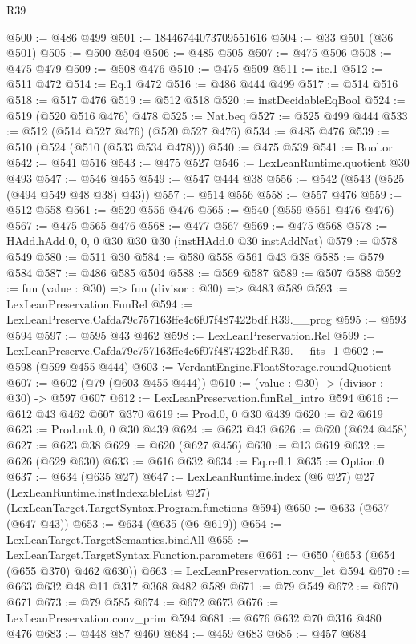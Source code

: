 \begin{lexlean}{R39}
\begin{coremodule}
@500 := @486 @499
@501 := 18446744073709551616
@504 := @33 @501 (@36 @501)
@505 := @500 @504
@506 := @485 @505
@507 := @475 @506
@508 := @475 @479
@509 := @508 @476
@510 := @475 @509
@511 := ite.{1}
@512 := @511 @472
@514 := Eq.{1} @472
@516 := @486 @444 @499
@517 := @514 @516
@518 := @517 @476
@519 := @512 @518
@520 := instDecidableEqBool
@524 := @519 (@520 @516 @476) @478
@525 := Nat.beq
@527 := @525 @499 @444
@533 := @512 (@514 @527 @476) (@520 @527 @476)
@534 := @485 @476
@539 := @510 (@524 (@510 (@533 @534 @478)))
@540 := @475 @539
@541 := Bool.or
@542 := @541 @516
@543 := @475 @527
@546 := LexLeanRuntime.quotient @30 @493
@547 := @546 @455
@549 := @547 @444 @38
@556 := @542 (@543 (@525 (@494 @549 @48 @38) @43))
@557 := @514 @556
@558 := @557 @476
@559 := @512 @558
@561 := @520 @556 @476
@565 := @540 (@559 @561 @476 @476)
@567 := @475 @565 @476
@568 := @477 @567
@569 := @475 @568
@578 := HAdd.hAdd.{0, 0, 0} @30 @30 @30 (instHAdd.{0} @30 instAddNat)
@579 := @578 @549
@580 := @511 @30
@584 := @580 @558 @561 @43 @38
@585 := @579 @584
@587 := @486 @585 @504
@588 := @569 @587
@589 := @507 @588
@592 := fun (value : @30) => fun (divisor : @30) => @483 @589
@593 := LexLeanPreservation.FunRel
@594 := LexLeanPreserve.Cafda79c757163ffe4c6f07f487422bdf.R39.__prog
@595 := @593 @594
@597 := @595 @43 @462
@598 := LexLeanPreservation.Rel
@599 := LexLeanPreserve.Cafda79c757163ffe4c6f07f487422bdf.R39.__fits_1
@602 := @598 (@599 @455 @444)
@603 := VerdantEngine.FloatStorage.roundQuotient
@607 := @602 (@79 (@603 @455 @444))
@610 := (value : @30) -> (divisor : @30) -> @597 @607
@612 := LexLeanPreservation.funRel_intro @594
@616 := @612 @43 @462 @607 @370
@619 := Prod.{0, 0} @30 @439
@620 := @2 @619
@623 := Prod.mk.{0, 0} @30 @439
@624 := @623 @43
@626 := @620 (@624 @458)
@627 := @623 @38
@629 := @620 (@627 @456)
@630 := @13 @619
@632 := @626 (@629 @630)
@633 := @616 @632
@634 := Eq.refl.{1}
@635 := Option.{0}
@637 := @634 (@635 @27)
@647 := LexLeanRuntime.index
    (@6 @27)
    @27
    (LexLeanRuntime.instIndexableList @27)
    (LexLeanTarget.TargetSyntax.Program.functions @594)
@650 := @633 (@637 (@647 @43))
@653 := @634 (@635 (@6 @619))
@654 := LexLeanTarget.TargetSemantics.bindAll
@655 := LexLeanTarget.TargetSyntax.Function.parameters
@661 := @650 (@653 (@654 (@655 @370) @462 @630))
@663 := LexLeanPreservation.conv_let @594
@670 := @663 @632 @48 @11 @317 @368 @482 @589
@671 := @79 @549
@672 := @670 @671
@673 := @79 @585
@674 := @672 @673
@676 := LexLeanPreservation.conv_prim @594
@681 := @676 @632 @70 @316 @480 @476
@683 := @448 @87 @460
@684 := @459 @683
@685 := @457 @684

\end{coremodule}
\end{lexlean}
